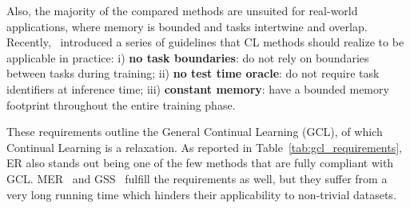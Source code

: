 \documentclass{article}
\begin{document}
Also, the majority of the compared methods are unsuited for real-world applications, where memory is bounded and tasks intertwine and overlap. Recently,~\cite{de2019continual}
introduced a series of guidelines that CL methods should realize to be applicable in practice:
i) \textbf{no task boundaries}: do not rely on boundaries between tasks during training;
ii) \textbf{no test time oracle}: do not require task identifiers at inference time;
iii) \textbf{constant memory}: have a bounded memory footprint throughout the entire training phase. 

These requirements outline the General Continual Learning (GCL), of which Continual Learning is a relaxation. As reported in Table~\ref{tab:gcl_requirements}, ER also stands out being one of the few methods that are fully compliant with GCL. MER~\cite{riemer2018learning} and GSS~\cite{aljundi2019gradient} fulfill the requirements as well, but they suffer from a very long running time which hinders their applicability to non-trivial datasets.
\end{document}
